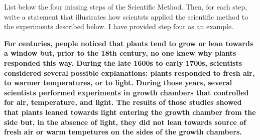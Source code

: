 \question[5]
List below the four missing steps of the Scientific Method. Then,
for each step, write a statement that illustrates how scientsts applied
the scientific method to the experiments described below. I have
provided step four as an example.

\textbf{For centuries, people noticed that plants tend to grow or lean
towards a window but, prior to the 18th century, no one knew why plants
responded this way. During the late 1600s to early 1700s, scientists
considered several possible explanations: plants responded to fresh air,
to warmer temperatures, or to light. During those years, several
scientists performed experiments in growth chambers that controlled for
air, temperature, and light. The results of those studies showed that
plants leaned towards light entering the growth chamber from the side
but, in the absence of light, they did not lean towards source of fresh
air or warm tempetures on the sides of the growth chambers. }




\newpage
